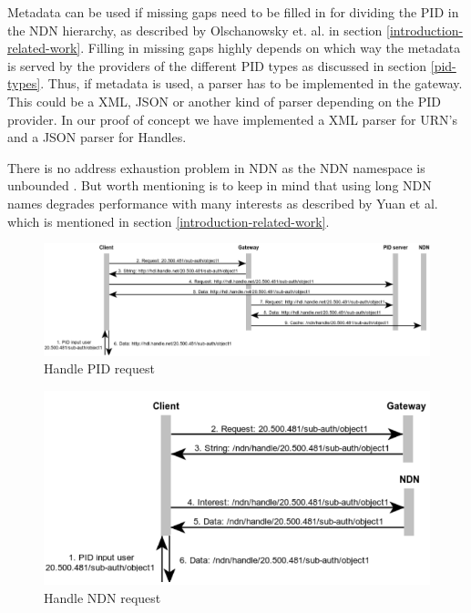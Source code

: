 Metadata can be used if missing gaps need to be filled in for dividing the PID in the NDN hierarchy, as described by Olschanowsky et. al. \cite{ndn-clim} in section \ref{introduction-related-work}. 
Filling in missing gaps highly depends on which way the metadata is served by the providers of the different PID types as discussed in section \ref{pid-types}. Thus, if metadata is used, a parser has to be implemented in the gateway. This could be a XML, JSON or another kind of parser depending on the PID provider. In our proof of concept we have implemented a XML parser for URN's and a JSON parser for Handles.

There is no address exhaustion problem in NDN as the NDN namespace is unbounded \cite{ndn-nspace}. But worth mentioning is to keep in mind that using long NDN names degrades performance with many interests as described by Yuan et al. \cite{yuan2012scalable} 
which is mentioned in section \ref{introduction-related-work}.

\begin{figure}[H]
    \centering
    \includegraphics[width=\textwidth]{Images/pid_seq5.png}
    \caption{Handle PID request\label{fig:seq_pid}}
\end{figure}

\begin{figure}[H]
\includegraphics[scale=0.75]{Images/ndn_req.png}
\caption{Handle NDN request}
\label{fig:seq_ndn}
\end{figure}

